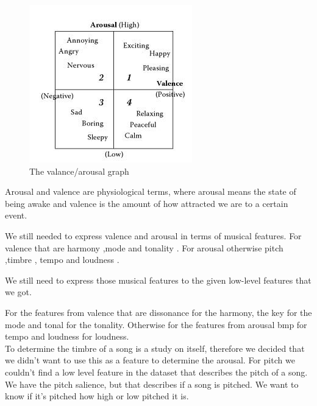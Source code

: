 \documentclass[10pt,a4paper]{article}
\begin{document}
\begin{figure}[h]
\includegraphics[scale=0.75]{avgraph.jpg}
\caption{The valance/arousal graph \cite{Book}}
\label{fig:avgraph}

\end{figure}

Arousal and valence are physiological terms, where arousal means the state of being awake and valence is the amount of how attracted we are to a certain event. 

We still needed to express valence and arousal in terms of musical features. 
For valence that are harmony \cite{PresentationMER},mode  \cite{PresentationMER} and tonality  \cite{PresentationMER}.
For arousal otherwise pitch \cite{PresentationMER} ,timbre \cite{PresentationMER}, tempo \cite{PresentationMER} and loudness \cite{PaperME}. 

We still need to express those musical features to the given low-level features that we got.

For the features from valence that are dissonance for the harmony, the key for the mode and tonal for the tonality.
Otherwise for the features from arousal bmp for tempo and loudness for loudness.\\

To determine the timbre of a song is a study on itself, therefore we decided that we didn't want to use this as a feature to determine the arousal.
For pitch we couldn't find a low level feature in the dataset that describes the pitch of a song. We have the pitch salience, but that describes if a song is pitched. We want to know if it's pitched how high or low pitched it is. 
\end{document}
